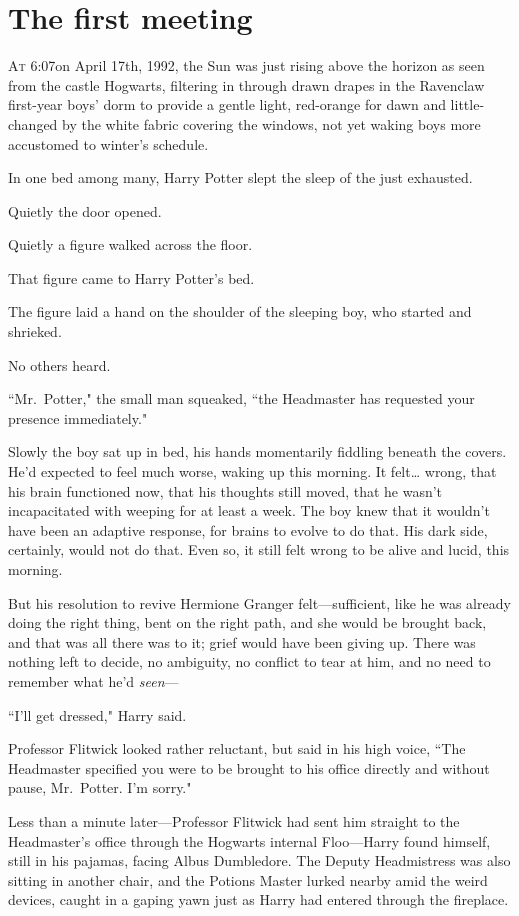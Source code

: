 
\section{The first meeting}

\lettrine{A}{t} 6:07\am on April 17th, 1992, the Sun was just rising above the horizon as seen from the castle Hogwarts, filtering in through drawn drapes in the Ravenclaw first-year boys' dorm to provide a gentle light, red-orange for dawn and little-changed by the white fabric covering the windows, not yet waking boys more accustomed to winter's schedule.

In one bed among many, Harry Potter slept the sleep of the just exhausted.

Quietly the door opened.

Quietly a figure walked across the floor.

That figure came to Harry Potter's bed.

The figure laid a hand on the shoulder of the sleeping boy, who started and shrieked.

No others heard.

``Mr.~Potter," the small man squeaked, ``the Headmaster has requested your presence immediately."

Slowly the boy sat up in bed, his hands momentarily fiddling beneath the covers. He'd expected to feel much worse, waking up this morning. It felt{\ldots} wrong, that his brain functioned now, that his thoughts still moved, that he wasn't incapacitated with weeping for at least a week. The boy knew that it wouldn't have been an adaptive response, for brains to evolve to do that. His dark side, certainly, would not do that. Even so, it still felt wrong to be alive and lucid, this morning.

But his resolution to revive Hermione Granger felt---sufficient, like he was already doing the right thing, bent on the right path, and she would be brought back, and that was all there was to it; grief would have been giving up. There was nothing left to decide, no ambiguity, no conflict to tear at him, and no need to remember what he'd \emph{seen}---

``I'll get dressed," Harry said.

Professor Flitwick looked rather reluctant, but said in his high voice, ``The Headmaster specified you were to be brought to his office directly and without pause, Mr.~Potter. I'm sorry."

Less than a minute later---Professor Flitwick had sent him straight to the Headmaster's office through the Hogwarts internal Floo---Harry found himself, still in his pajamas, facing Albus Dumbledore. The Deputy Headmistress was also sitting in another chair, and the Potions Master lurked nearby amid the weird devices, caught in a gaping yawn just as Harry had entered through the fireplace.

